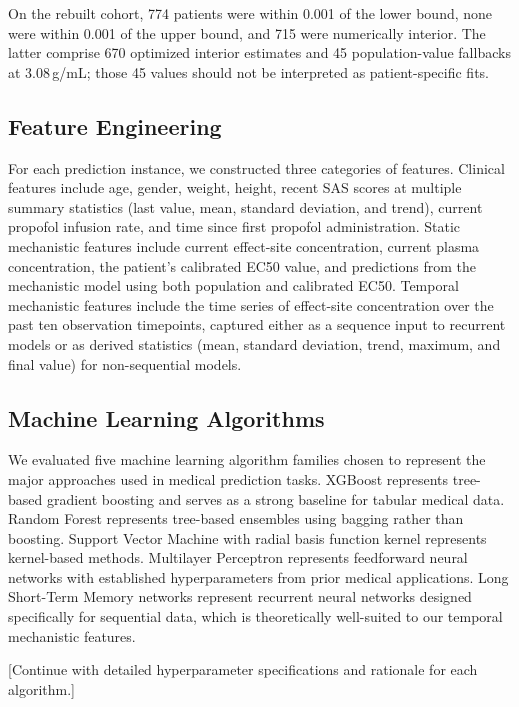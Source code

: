 \documentclass[11pt,a4paper]{article}
\begin{document}
On the rebuilt cohort, 774 patients were within 0.001 of the lower bound, none were within 0.001 of the upper bound, and 715 were numerically interior. The latter comprise 670 optimized interior estimates and 45 population-value fallbacks at 3.08\,\textmu g/mL; those 45 values should not be interpreted as patient-specific fits.

\subsection{Feature Engineering}

For each prediction instance, we constructed three categories of features. Clinical features include age, gender, weight, height, recent SAS scores at multiple summary statistics (last value, mean, standard deviation, and trend), current propofol infusion rate, and time since first propofol administration. Static mechanistic features include current effect-site concentration, current plasma concentration, the patient's calibrated EC50 value, and predictions from the mechanistic model using both population and calibrated EC50. Temporal mechanistic features include the time series of effect-site concentration over the past ten observation timepoints, captured either as a sequence input to recurrent models or as derived statistics (mean, standard deviation, trend, maximum, and final value) for non-sequential models.

\subsection{Machine Learning Algorithms}

We evaluated five machine learning algorithm families chosen to represent the major approaches used in medical prediction tasks. XGBoost \cite{chen_xgboost_2016} represents tree-based gradient boosting and serves as a strong baseline for tabular medical data. Random Forest \cite{breiman_2001} represents tree-based ensembles using bagging rather than boosting. Support Vector Machine with radial basis function kernel \cite{smola_svr_2004} represents kernel-based methods. Multilayer Perceptron represents feedforward neural networks with established hyperparameters from prior medical applications. Long Short-Term Memory networks \cite{hochreiter_lstm_1997} represent recurrent neural networks designed specifically for sequential data, which is theoretically well-suited to our temporal mechanistic features.

[Continue with detailed hyperparameter specifications and rationale for each algorithm.]
\end{document}
